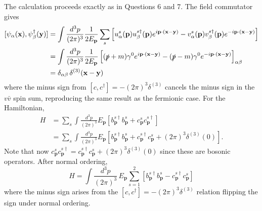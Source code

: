 \begin{solution}
    The calculation proceeds exactly as in Questions 6 and 7. The field commutator gives
    \begin{equation}
    \begin{aligned}
        [\psi_\alpha(\mathbf{x}), \psi^\dagger_\beta(\mathbf{y})] &= \int\frac{d^3p}{(2\pi)^3}\frac{1}{2E_\mathbf{p}}\sum_s\left[u^s_\alpha(\mathbf{p})u^{s\dagger}_\beta(\mathbf{p})e^{i\mathbf{p}\cdot(\mathbf{x}-\mathbf{y})} - v^s_\alpha(\mathbf{p})v^{s\dagger}_\beta(\mathbf{p})e^{-i\mathbf{p}\cdot(\mathbf{x}-\mathbf{y})}\right]\\
        &= \int\frac{d^3p}{(2\pi)^3}\frac{1}{2E_\mathbf{p}}\left[(\slashed{p}+m)\gamma^0 e^{i\mathbf{p}\cdot(\mathbf{x}-\mathbf{y})} - (\slashed{p}-m)\gamma^0 e^{-i\mathbf{p}\cdot(\mathbf{x}-\mathbf{y})}\right]_{\alpha\beta}\\
        &= \delta_{\alpha\beta}\,\delta^{(3)}(\mathbf{x}-\mathbf{y})
    \end{aligned}
    \end{equation}
    where the minus sign from $[c,c^\dagger] = -(2\pi)^3\delta^{(3)}$ cancels the minus sign in the $v\bar{v}$ spin sum, reproducing the same result as the fermionic case. For the Hamiltonian,
    \begin{equation}
    \begin{aligned}
        H &= \sum_s\int\frac{d^3p}{(2\pi)^3}E_\mathbf{p}\left[b^{s\dagger}_\mathbf{p} b^s_\mathbf{p} + c^s_\mathbf{p} c^{s\dagger}_\mathbf{p}\right]\\
        &= \sum_s\int\frac{d^3p}{(2\pi)^3}E_\mathbf{p}\left[b^{s\dagger}_\mathbf{p} b^s_\mathbf{p} + c^{s\dagger}_\mathbf{p} c^s_\mathbf{p} + (2\pi)^3\delta^{(3)}(0)\right].
    \end{aligned}
    \end{equation}
    Note that now $c^s_\mathbf{p} c^{s\dagger}_\mathbf{p} = c^{s\dagger}_\mathbf{p} c^s_\mathbf{p} + (2\pi)^3\delta^{(3)}(0)$ since these are bosonic operators. After normal ordering,
    \begin{equation}
        H = \int\frac{d^3p}{(2\pi)^3}\,E_\mathbf{p}\sum_{s=1}^2\left[b^{s\dagger}_\mathbf{p} b^s_\mathbf{p} - c^{s\dagger}_\mathbf{p} c^s_\mathbf{p}\right]
    \end{equation}
    where the minus sign arises from the $[c,c^\dagger]=-(2\pi)^3\delta^{(3)}$ relation flipping the sign under normal ordering.
\end{solution}